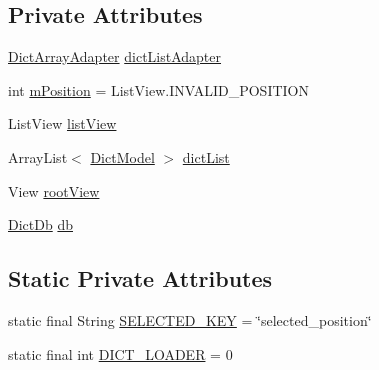 \subsection*{Private Attributes}
\begin{DoxyCompactItemize}
\item 
\hyperlink{classorg_1_1buildmlearn_1_1dictation_1_1adapter_1_1DictArrayAdapter}{Dict\+Array\+Adapter} \hyperlink{classorg_1_1buildmlearn_1_1dictation_1_1fragment_1_1MainActivityFragment_a4e5c30611b7317ec857f3d2c25269f31}{dict\+List\+Adapter}
\item 
int \hyperlink{classorg_1_1buildmlearn_1_1dictation_1_1fragment_1_1MainActivityFragment_aa630736f1ea299705063719ad14383bb}{m\+Position} = List\+View.\+I\+N\+V\+A\+L\+I\+D\+\_\+\+P\+O\+S\+I\+T\+I\+ON
\item 
List\+View \hyperlink{classorg_1_1buildmlearn_1_1dictation_1_1fragment_1_1MainActivityFragment_abdea16d98a96c7cdcabe5fbd148b62ca}{list\+View}
\item 
Array\+List$<$ \hyperlink{classorg_1_1buildmlearn_1_1dictation_1_1data_1_1DictModel}{Dict\+Model} $>$ \hyperlink{classorg_1_1buildmlearn_1_1dictation_1_1fragment_1_1MainActivityFragment_a979af6e645820cfe6c79bc4c0eced95a}{dict\+List}
\item 
View \hyperlink{classorg_1_1buildmlearn_1_1dictation_1_1fragment_1_1MainActivityFragment_ad705eb8f000e5cb49010a945d0e063cf}{root\+View}
\item 
\hyperlink{classorg_1_1buildmlearn_1_1dictation_1_1data_1_1DictDb}{Dict\+Db} \hyperlink{classorg_1_1buildmlearn_1_1dictation_1_1fragment_1_1MainActivityFragment_a5800ce712448da2e7f7e1d32e2aadfc6}{db}
\end{DoxyCompactItemize}
\subsection*{Static Private Attributes}
\begin{DoxyCompactItemize}
\item 
static final String \hyperlink{classorg_1_1buildmlearn_1_1dictation_1_1fragment_1_1MainActivityFragment_a8ee42ebe6cc76df5d24ac303838d8072}{S\+E\+L\+E\+C\+T\+E\+D\+\_\+\+K\+EY} = \char`\"{}selected\+\_\+position\char`\"{}
\item 
static final int \hyperlink{classorg_1_1buildmlearn_1_1dictation_1_1fragment_1_1MainActivityFragment_afffa3850eb5615b9ce637d912456472d}{D\+I\+C\+T\+\_\+\+L\+O\+A\+D\+ER} = 0
\end{DoxyCompactItemize}



